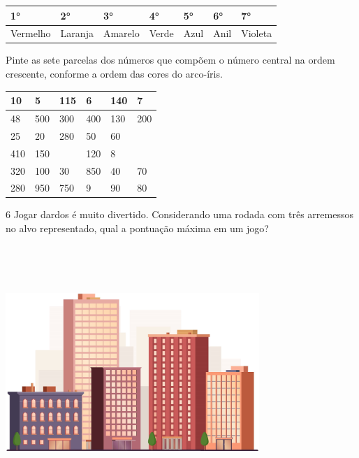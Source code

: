 \begin{longtable}[]{@{}lllllll@{}}
\toprule
1° & 2° & 3° & 4° & 5° & 6° & 7°\tabularnewline
\midrule
\endhead
Vermelho & Laranja & Amarelo & Verde & Azul & Anil &
Violeta\tabularnewline
\bottomrule
\end{longtable}

Pinte as sete parcelas dos números que compõem o número central na ordem
crescente, conforme a ordem das cores do arco-íris.

\begin{longtable}[]{@{}llllll@{}}
\toprule
10 & 5 & 115 & 6 & 140 & 7\tabularnewline
\midrule
\endhead
48 & 500 & 300 & 400 & 130 & 200\tabularnewline
25 & 20 & 280 & 50 & 60\tabularnewline
410 & 150 & & 120 & 8\tabularnewline
320 & 100 & 30 & 850 & 40 & 70\tabularnewline
280 & 950 & 750 & 9 & 90 & 80\tabularnewline
\bottomrule
\end{longtable}


\num{6} Jogar dardos é muito divertido. Considerando uma rodada com três arremessos no alvo representado, qual a pontuação máxima em um jogo?


\includegraphics[width=3.78624in,height=3.80208in]{media/image31.png}


